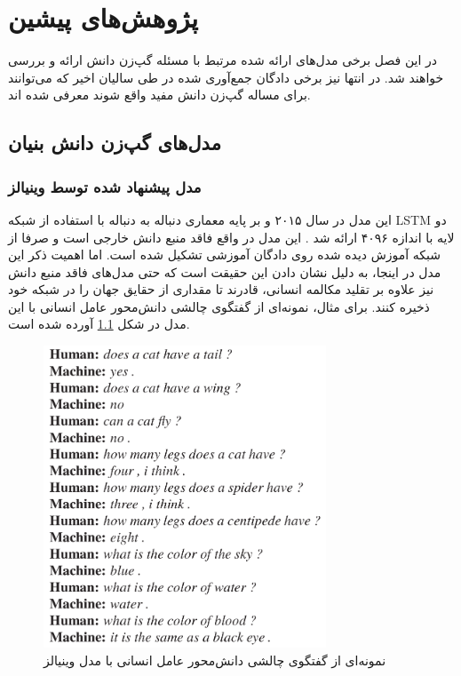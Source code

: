 \chapter{پژوهش‌های پیشین}\label{chap2}
\minitoc

در این فصل برخی مدل‌های ارائه شده مرتبط با مسئله گپ‌زن دانش  ارائه و بررسی خواهند شد. در انتها نیز برخی دادگان جمع‌آوری شده در طی سالیان اخیر که می‌توانند برای مساله گپ‌زن دانش مفید واقع شوند معرفی شده اند.

\section{مدل‌های گپ‌زن دانش بنیان}\label{intro}

\subsection{مدل پیشنهاد شده توسط وینیالز}

این مدل در سال ۲۰۱۵ و بر پایه معماری دنباله به دنباله با استفاده از شبکه LSTM 
دو لایه با اندازه 
۴۰۹۶
ارائه شد
\cite{A_Neural_Conversational_Model}.
این مدل در واقع فاقد منبع دانش خارجی است و صرفا از شبکه آموزش دیده شده روی دادگان آموزشی تشکیل شده است. اما اهمیت ذکر این مدل در اینجا، به دلیل نشان دادن این حقیقت است که حتی مدل‌های فاقد منبع دانش نیز  علاوه بر تقلید 
 مکالمه انسانی، قادرند تا مقداری از حقایق جهان را در شبکه خود ذخیره کنند.
 برای مثال،‌ نمونه‌ای از گفتگوی چالشی دانش‌محور عامل انسانی با این مدل در شکل
 \ref{fig:chap2:Vinyals1}
 آورده شده است.

\begin{figure}[h]
	\centering
	\includegraphics[width=0.75\textwidth]{images/chap2/Vinyals1.png}
	\caption{
		نمونه‌‌ای از گفتگوی چالشی دانش‌محور عامل انسانی با مدل وینیالز
		\cite{A_Neural_Conversational_Model} 
	}
	\label{fig:chap2:Vinyals1}
\end{figure}

